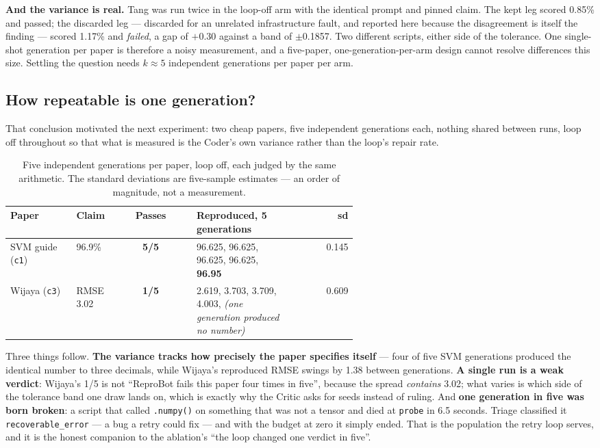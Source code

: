 \documentclass[10pt,twocolumn]{article}
\newcommand{\squeeze}{\setlength{\tabcolsep}{4pt}}
\begin{document}
\textbf{And the variance is real.} Tang was run twice in the loop-off arm with the identical
prompt and pinned claim. The kept leg scored 0.85\% and passed; the discarded leg --- discarded
for an unrelated infrastructure fault, and reported here because the disagreement is itself the
finding --- scored 1.17\% and \emph{failed}, a gap of $+0.30$ against a band of $\pm$0.1857. Two
different scripts, either side of the tolerance. One single-shot generation per paper is
therefore a noisy measurement, and a five-paper, one-generation-per-arm design cannot resolve
differences this size. Settling the question needs $k \approx 5$ independent generations per
paper per arm.

\subsection{How repeatable is one generation?}

That conclusion motivated the next experiment: two cheap papers, five independent generations
each, nothing shared between runs, loop off throughout so that what is measured is the Coder's own
variance rather than the loop's repair rate.

\begin{table}[tbp]
\centering
\small
\caption{Five independent generations per paper, loop off, each judged by the same arithmetic. The
standard deviations are five-sample estimates --- an order of magnitude, not a measurement.}
\label{tab:consistency}
\squeeze
\begin{tabular}{L{0.19\linewidth}L{0.11\linewidth}cL{0.29\linewidth}r}
\toprule
Paper & Claim & Passes & Reproduced, 5 generations & sd \\
\midrule
SVM guide (\texttt{c1}) & 96.9\% & \textbf{5/5} & 96.625, 96.625, 96.625, 96.625, \textbf{96.95} &
  0.145 \\
Wijaya (\texttt{c3}) & RMSE 3.02 & \textbf{1/5} & 2.619, 3.703, 3.709, 4.003, \emph{(one
  generation produced no number)} & 0.609 \\
\bottomrule
\end{tabular}
\end{table}

Three things follow. \textbf{The variance tracks how precisely the paper specifies itself} --- four
of five SVM generations produced the identical number to three decimals, while Wijaya's
reproduced RMSE swings by 1.38 between generations. \textbf{A single run is a weak verdict}:
Wijaya's 1/5 is not ``ReproBot fails this paper four times in five'', because the spread
\emph{contains} 3.02; what varies is which side of the tolerance band one draw lands on, which is
exactly why the Critic asks for seeds instead of ruling. And \textbf{one generation in five was
born broken}: a script that called \texttt{.numpy()} on something that was not a tensor and died
at \texttt{probe} in 6.5 seconds. Triage classified it \texttt{recoverable\_error} --- a bug a
retry could fix --- and with the budget at zero it simply ended. That is the population the retry
loop serves, and it is the honest companion to the ablation's ``the loop changed one verdict in
five''.
\end{document}
